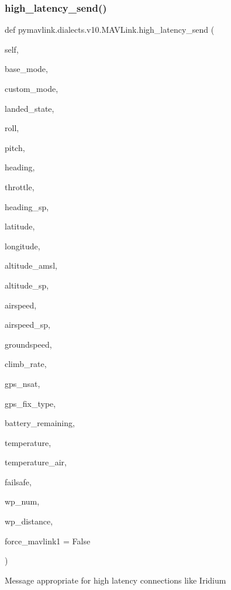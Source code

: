\begin{DoxyVerb}
\begin{DoxyVerb}
\subsubsection{\texorpdfstring{high\+\_\+latency\+\_\+send()}{high\_latency\_send()}}
{\footnotesize\ttfamily def pymavlink.\+dialects.\+v10.\+M\+A\+V\+Link.\+high\+\_\+latency\+\_\+send (\begin{DoxyParamCaption}\item[{}]{self,  }\item[{}]{base\+\_\+mode,  }\item[{}]{custom\+\_\+mode,  }\item[{}]{landed\+\_\+state,  }\item[{}]{roll,  }\item[{}]{pitch,  }\item[{}]{heading,  }\item[{}]{throttle,  }\item[{}]{heading\+\_\+sp,  }\item[{}]{latitude,  }\item[{}]{longitude,  }\item[{}]{altitude\+\_\+amsl,  }\item[{}]{altitude\+\_\+sp,  }\item[{}]{airspeed,  }\item[{}]{airspeed\+\_\+sp,  }\item[{}]{groundspeed,  }\item[{}]{climb\+\_\+rate,  }\item[{}]{gps\+\_\+nsat,  }\item[{}]{gps\+\_\+fix\+\_\+type,  }\item[{}]{battery\+\_\+remaining,  }\item[{}]{temperature,  }\item[{}]{temperature\+\_\+air,  }\item[{}]{failsafe,  }\item[{}]{wp\+\_\+num,  }\item[{}]{wp\+\_\+distance,  }\item[{}]{force\+\_\+mavlink1 = {\ttfamily False} }\end{DoxyParamCaption})}

\begin{DoxyVerb}Message appropriate for high latency connections like Iridium


\end{DoxyVerb}
\end{DoxyVerb}
\end{DoxyVerb}

